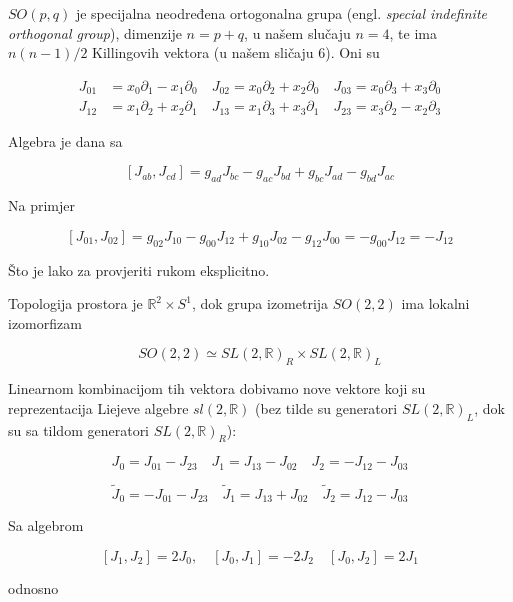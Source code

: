 \noindent$SO(p,q)$ je specijalna neodređena ortogonalna grupa (engl. \textit{special indefinite orthogonal group}), dimenzije $n=p+q$, u našem slučaju $n=4$, te ima $n(n-1)/2$ Killingovih vektora (u našem sličaju 6). Oni su

\begin{equation*}
\begin{split}
J_{01}&=x_0\partial_1-x_1\partial_0\quad J_{02}=x_0\partial_2+x_2\partial_0\quad J_{03}=x_0\partial_3+x_3\partial_0\\
J_{12}&=x_1\partial_2+x_2\partial_1\quad J_{13}=x_1\partial_3+x_3\partial_1\quad J_{23}=x_3\partial_2-x_2\partial_3
\end{split}
\end{equation*}

\noindent Algebra je dana sa

$$[J_{ab},J_{cd}]=g_{ad}J_{bc}-g_{ac}J_{bd}+g_{bc}J_{ad}-g_{bd}J_{ac}$$

\noindent Na primjer

$$[J_{01},J_{02}]=g_{02}J_{10}-g_{00}J_{12}+g_{10}J_{02}-g_{12}J_{00}=-g_{00}J_{12}=-J_{12}$$

\noindent Što je lako za provjeriti rukom eksplicitno.

\noindent Topologija prostora je $\mathbb{R}^2\times S^1$, dok grupa izometrija $SO(2,2)$ ima lokalni izomorfizam

\begin{equation*}
SO(2,2)\simeq SL(2,\mathbb{R})_R\times SL(2,\mathbb{R})_L
\end{equation*}

\noindent Linearnom kombinacijom tih vektora dobivamo nove vektore koji su reprezentacija Liejeve algebre $sl(2,\mathbb{R})$ (bez tilde su generatori $SL(2,\mathbb{R})_L$, dok su sa tildom generatori $SL(2,\mathbb{R})_R$):

\begin{equation*}
J_{0}=J_{01}-J_{23}\quad J_{1}=J_{13}-J_{02}\quad J_{2}=-J_{12}-J_{03}
\end{equation*}

\begin{equation*}
\tilde{J}_{0}=-J_{01}-J_{23}\quad \tilde{J}_{1}=J_{13}+J_{02}\quad \tilde{J}_{2}=J_{12}-J_{03}
\end{equation*}

\noindent Sa algebrom

$$[J_1,J_2]=2J_0,\quad [J_0,J_1]=-2J_2\quad [J_0,J_2]=2J_1$$

\noindent odnosno


